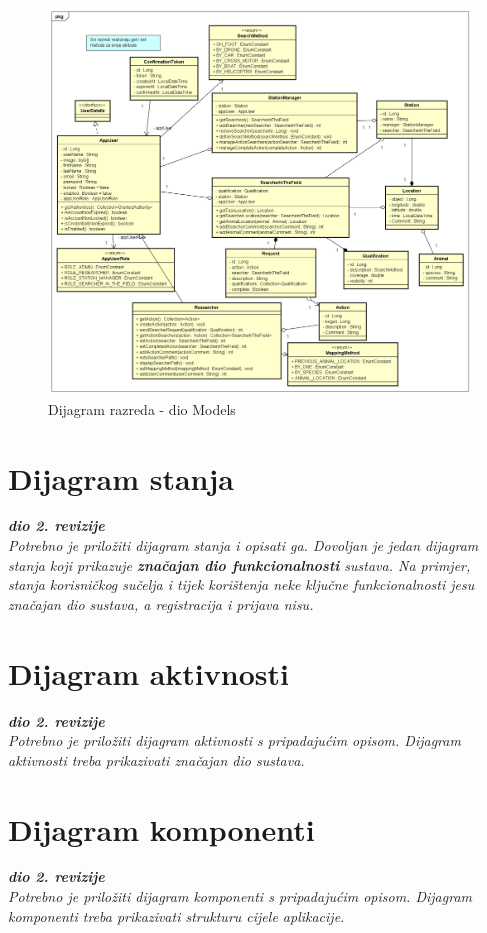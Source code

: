 			\begin{figure}[H]
				\includegraphics[scale=0.4]{dijagrami/Model.png} 
				\centering
				\caption{Dijagram razreda - dio Models}
				\label{fig:promjene}
			\end{figure}
			
			
			\eject
		
		\section{Dijagram stanja}
			
			
			\textbf{\textit{dio 2. revizije}}\\
			
			\textit{Potrebno je priložiti dijagram stanja i opisati ga. Dovoljan je jedan dijagram stanja koji prikazuje \textbf{značajan dio funkcionalnosti} sustava. Na primjer, stanja korisničkog sučelja i tijek korištenja neke ključne funkcionalnosti jesu značajan dio sustava, a registracija i prijava nisu. }
			
			
			\eject 
		
		\section{Dijagram aktivnosti}
			
			\textbf{\textit{dio 2. revizije}}\\
			
			 \textit{Potrebno je priložiti dijagram aktivnosti s pripadajućim opisom. Dijagram aktivnosti treba prikazivati značajan dio sustava.}
			
			\eject
		\section{Dijagram komponenti}
		
			\textbf{\textit{dio 2. revizije}}\\
		
			 \textit{Potrebno je priložiti dijagram komponenti s pripadajućim opisom. Dijagram komponenti treba prikazivati strukturu cijele aplikacije.}